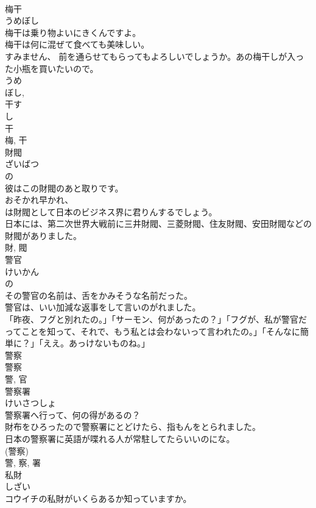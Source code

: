 \documentclass[8pt]{extreport}
\begin{document}
\begin{CJK}{UTF8}{min}
\\	梅干	
\\	うめぼし	
\\	梅干は乗り物よいにきくんですよ。	
\\	梅干は何に混ぜて食べても美味しい。	
\\	すみません、 前を通らせてもらってもよろしいでしょうか。あの梅干しが入った小瓶を買いたいので。	
\\	うめ 
\\	ぼし, 
\\	干す 
\\	し 
\\	干 
\\	梅, 干	
\\	財閥	
\\	ざいばつ	
\\	の 
\\	彼はこの財閥のあと取りです。	
\\	おそかれ早かれ、
\\	は財閥として日本のビジネス界に君りんするでしょう。	
\\	日本には、第二次世界大戦前に三井財閥、三菱財閥、住友財閥、安田財閥などの財閥がありました。	
\\	財, 閥	
\\	警官	
\\	けいかん	
\\	の 
\\	その警官の名前は、舌をかみそうな名前だった。	
\\	警官は、いい加減な返事をして言いのがれました。	
\\	「昨夜、フグと別れたの。」「サーモン、何があったの？」「フグが、私が警官だってことを知って、それで、もう私とは会わないって言われたの。」「そんなに簡単に？」「ええ。あっけないものね。」	
\\	警察 
\\	警察 
\\	警, 官	
\\	警察署	
\\	けいさつしょ	
\\	警察署へ行って、何の得があるの？	
\\	財布をひろったので警察署にとどけたら、指もんをとられました。	
\\	日本の警察署に英語が喋れる人が常駐してたらいいのにな。	
\\	(警察) 
\\	警, 察, 署	
\\	私財	
\\	しざい	
\\	コウイチの私財がいくらあるか知っていますか。	

\end{CJK}
\end{document}
